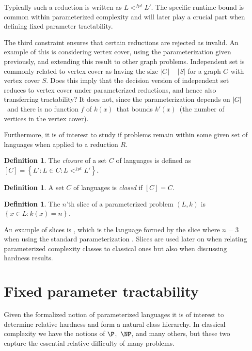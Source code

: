\documentclass[a4paper,11pt]{report}
\theoremstyle{plain}
\theoremstyle{definition}
\newtheorem{defn}[thm]{Definition} %
\begin{document}
Typically such a reduction is written as $L <^{fpt} L'$.
The specific runtime bound is common within parameterized complexity and will later play a crucial part when defining fixed parameter tractability.

The third constraint ensures that certain reductions are rejected as invalid.
An example of this is considering vertex cover, using the parameterization given previously, and extending this result to other graph problems.
Independent set is commonly related to vertex cover as having the size $|G| - |S|$ for a graph $G$ with vertex cover $S$.
Does this imply that the decision version of independent set reduces to vertex cover under parameterized reductions, and hence also transferring tractability?
It does not, since the parameterization depends on $|G|$ and there is no function $f$ of $k(x)$ that bounds $k'(x)$ (the number of vertices in the vertex cover).

Furthermore, it is of interest to study if problems remain within some given set of languages when applied to a reduction $R$.

\begin{defn}
The \emph{closure} of a set $C$ of languages is defined as $\left[ C \right] = \left\{ L' : L \in C : L <^{fpt} L'\right\}$.
\end{defn}

\begin{defn}
A set $C$ of languages is \emph{closed} if $\left[ C \right] = C$.
\end{defn}

\begin{defn}
The $n$'th slice of a parameterized problem $(L, k)$ is $\left\{ x \in L : k(x) = n \right\}$.
\end{defn}

An example of slices is , which is the language formed by the slice where $n = 3$ when using the standard parameterization .
Slices are used later on when relating parameterized complexity classes to classical ones but also when discussing hardness results.

\section{Fixed parameter tractability}
Given the formalized notion of parameterized languages it is of interest to determine relative hardness and form a natural class hierarchy.
In classical complexity we have the notions of $\P$, $\NP$, and many others, but these two capture the essential relative difficulty of many problems.
\end{document}
